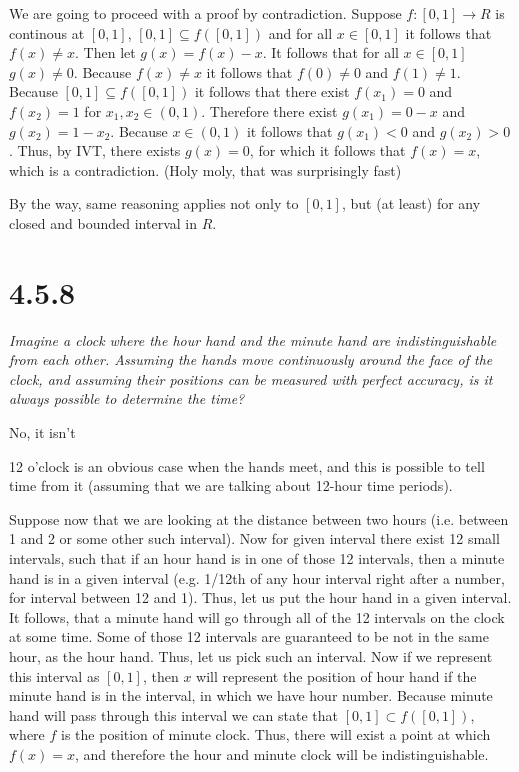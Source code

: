 \documentclass[11pt,oneside,titlepage]{book}
\begin{document}
We are going to proceed with a proof by contradiction.
Suppose $f: [0, 1] \to R$ is
continous at $[0, 1]$, $[0, 1] \subseteq f([0, 1])$ and for all 
$x \in [0, 1]$ it follows that $f(x) \neq x$. Then let 
$g(x) = f(x) - x$.
It follows that for all $x \in [0, 1]$ $g(x) \neq 0$.
Because $f(x) \neq x$ it follows that $f(0) \neq 0$ and $f(1) \neq 1$.
Because $[0, 1] \subseteq f([0, 1])$ it follows that there exist
$f(x_1) = 0$ and $f(x_2) = 1$ for $x_1, x_2 \in (0, 1)$. Therefore
there exist $g(x_1) = 0 - x$ and $g(x_2) = 1 - x_2$. Because $x \in (0, 1)$
it follows that $g(x_1) < 0$ and $g(x_2) > 0$. Thus, by IVT, there
exists $g(x) = 0$, for which it follows that $f(x) = x$, which is a
contradiction. (Holy moly, that was surprisingly fast)

By the way, same reasoning applies not only to $[0, 1]$, but (at least) for
any closed and bounded interval in $R$.

\section*{4.5.8}
\textit{Imagine a clock where the hour hand and the minute hand are
  indistinguishable from each other.
  Assuming the hands move continuously around
  the face of the clock, and assuming their positions can be measured with
  perfect accuracy, is it always possible to determine the time?
}

No, it isn't

12 o'clock is an obvious case when the hands meet, and this is possible
to tell time from it (assuming that we are talking about 12-hour time periods).

Suppose now that we are looking at the distance between two hours (i.e.
between 1 and 2 or some other such interval).
Now for given interval there exist 12 small intervals, such that if
an hour hand is in one of those 12 intervals, then a minute hand is in a
given interval (e.g. 1/12th of any hour interval right after a  number,
for interval between 12 and 1). Thus, let us put the hour hand
in a given interval. It follows, that a minute hand will go through all of the
12 intervals on the clock at some time. Some of those 12 intervals are
guaranteed to be not in the same hour, as the hour hand. Thus, let us pick
such an interval. Now if we represent this interval as $[0, 1]$, then
$x$ will represent the position of hour hand if the minute hand is
in the interval, in which we have hour number. Because minute hand will pass
through this interval we can state that $[0, 1] \subset f([0, 1])$, where
$f$ is the position of minute clock. Thus, there will exist a point at
which $f(x) = x$, and therefore the hour and minute clock will be
indistinguishable.
\end{document}
